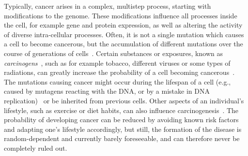 Typically, cancer arises in a complex, multistep process, starting with modifications to the genome.
These modifications influence all processes inside the cell, for example gene and protein expression, as well as altering the activity of diverse intra-cellular processes.
Often, it is not a single mutation which causes a cell to become cancerous, but the accumulation of different mutations over the course of generations of cells~\cite{stem_cell_mutations}.
Certain substances or exposures, known as \textit{carcinogens}~\cite{carcinogens-def}, such as for example tobacco, different viruses or some types of radiations, can greatly increase the probability of a cell becoming cancerous~\cite{carcinogens}.
The mutations causing cancer might occur during the lifespan of a cell (e.g., caused by mutagens reacting with the DNA, or by a mistake in DNA replication)~\cite{mutations} or be inherited from previous cells.
Other aspects of an individual's lifestyle, such as exercise or diet habits, can also influence carcinogenesis~\cite{carcinogens,carcinogens-def}.
The probability of developing cancer can be reduced by avoiding known risk factors and adapting one's lifestyle accordingly, but still, the formation of the disease is random-dependent and currently barely foreseeable, and can therefore never be completely ruled out.

